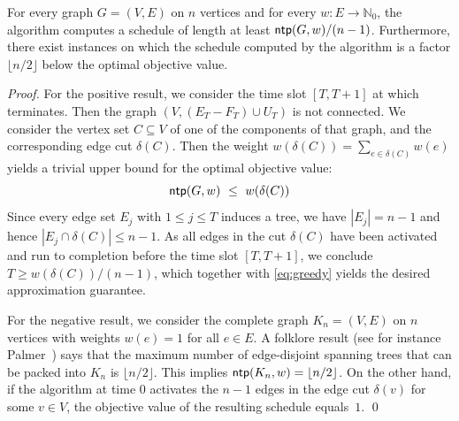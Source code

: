 \documentclass[runningheads]{llncs}
\newcommand{\NN}{\mathbb{N}}
\DeclareMathOperator{\ntp}{\text{\sf ntp}}
\newcommand{\greedy}{\text{\sf Greedy}}
\begin{document}
\begin{theorem}
\label{th:greedy.approx}
For every graph $G=(V,E)$ on $n$ vertices and for every $w:E\to\NN_0$, 
the {\greedy} algorithm computes a schedule of length at least $\ntp(G,w)/(n-1)$.
Furthermore, there exist instances on which the schedule computed by the 
{\greedy} algorithm is a factor $\lfloor n/2\rfloor$ below the optimal objective value.
\end{theorem}
\begin{proof}
For the positive result, we consider the time slot $[T,T+1]$ at which {\greedy} terminates.
Then the graph $(V,(E_T-F_T)\cup U_T)$ is not connected.
We consider the vertex set $C\subseteq V$ of one of the components of that graph, and the
corresponding edge cut $\delta(C)$.
Then the weight $w(\delta(C))=\sum_{e\in\delta(C)}w(e)$ yields a trivial upper bound for the 
optimal objective value: 
\begin{equation}
\label{eq:greedy}
\ntp(G,w) ~\le~ w(\delta(C))
\end{equation}
Since every edge set $E_j$ with $1\le j\le T$ induces a tree, we have $|E_j|=n-1$ and hence
$|E_j\cap \delta(C)|\le n-1$.
As all edges in the cut $\delta(C)$ have been activated and run to completion before the 
time slot $[T,T+1]$, we conclude $T\ge w(\delta(C))/(n-1)$, which together with \eqref{eq:greedy}
yields the desired approximation guarantee.

For the negative result, we consider the complete graph $K_n=(V,E)$ on $n$ vertices with 
weights $w(e)=1$ for all $e\in E$.
A folklore result (see for instance Palmer~\cite{Palmer2001}) says that the maximum number of 
edge-disjoint spanning trees that can be packed into $K_n$ is $\lfloor n/2\rfloor$.
This implies $\ntp(K_n,w)=\lfloor n/2\rfloor$.
On the other hand, if the {\greedy} algorithm at time $0$ activates the $n-1$ edges in the edge
cut $\delta(v)$ for some $v\in V$, the objective value of the resulting schedule equals~$1$.
\qed
\end{proof}
\end{document}
